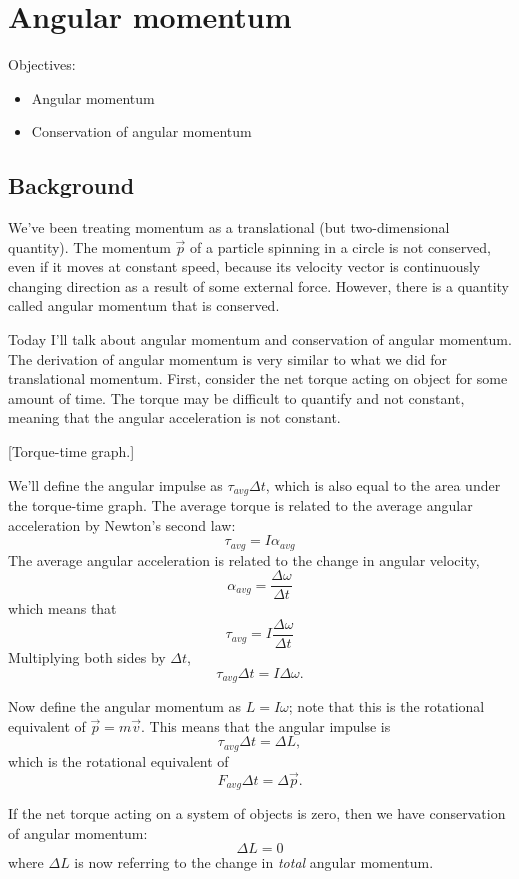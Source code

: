 \section{Angular momentum}
Objectives:
\begin{itemize}
\item Angular momentum
\item Conservation of angular momentum
\end{itemize}

\subsection{Background}
We've been treating momentum as a translational (but two-dimensional quantity). The momentum $\vec{p}$ of a particle spinning in a circle is not conserved, even if it moves at constant speed, because its velocity vector is continuously changing direction as a result of some external force. However, there is a quantity called angular momentum that is conserved.

Today I'll talk about angular momentum and conservation of angular momentum. The derivation of angular momentum is very similar to what we did for translational momentum. First, consider the net torque acting on object for some amount of time. The torque may be difficult to quantify and not constant, meaning that the angular acceleration is not constant.

[Torque-time graph.]
\vspace{3cm}

We'll define the angular impulse as $\tau_{avg}\Delta t$, which is also equal to the area under the torque-time graph. The average torque is related to the average angular acceleration by Newton's second law:
$$\tau_{avg} = I\alpha_{avg}$$
The average angular acceleration is related to the change in angular velocity,
$$\alpha_{avg}=\frac{\Delta \omega}{\Delta t}$$
which means that
$$\tau_{avg}=I\frac{\Delta\omega}{\Delta t}$$
Multiplying both sides by $\Delta t$,
$$\tau_{avg}\Delta t = I\Delta \omega.$$

Now define the angular momentum as $L=I\omega$; note that this is the rotational equivalent of $\vec{p}=m\vec{v}$. This means that the angular impulse is
$$\tau_{avg}\Delta t = \Delta L,$$
which is the rotational equivalent of
$$F_{avg}\Delta t = \Delta\vec{p}.$$

If the net torque acting on a system of objects is zero, then we have conservation of angular momentum:
$$\boxed{\Delta L = 0}$$
where $\Delta L$ is now referring to the change in \textit{total} angular momentum.

